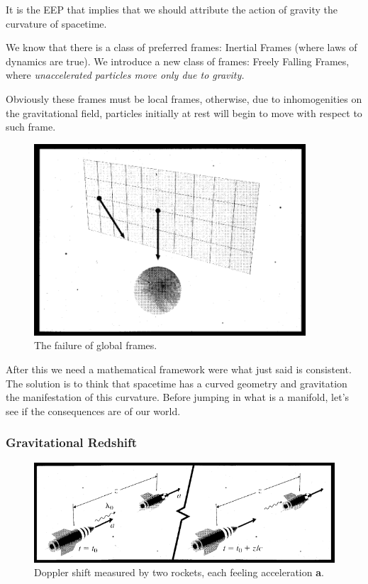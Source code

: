 It is the EEP that implies that we should attribute the action of gravity the curvature of spacetime.

We know that there is a class of preferred frames: Inertial Frames (where laws of dynamics are true).
We introduce a new class of frames: Freely Falling Frames, where \emph{ unaccelerated particles move only due to gravity.} \par
Obviously these frames must be local frames, otherwise, due to inhomogenities on the gravitational field, particles initially at rest will begin to move with respect to such frame.
\begin{figure}[h]
\centering
\includegraphics[width=0.8\linewidth]{imm/failureglobal.png}
\caption{The failure of global frames.}
\label{imm:failureglobal}
\end{figure}

After this we need a mathematical framework were what just said is consistent. The solution is to think that spacetime has a curved geometry and gravitation the manifestation of this curvature.
Before jumping in what is a manifold, let's see if the consequences are of our world.

\subsubsection{Gravitational Redshift}
\begin{figure}[h]
\centering
\includegraphics[width=0.8\linewidth]{imm/gravshift1.png}
\caption{Doppler shift measured by two rockets, each feeling acceleration \textbf{a}.}
\label{imm:gravshift1.png}
\end{figure}

